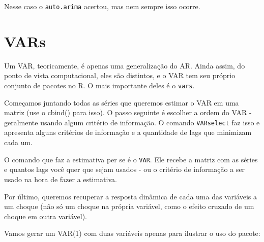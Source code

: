 \documentclass[
]{book}
\begin{document}
Nesse caso o \texttt{auto.arima} acertou, mas nem sempre isso ocorre.

\hypertarget{vars}{%
\section{VARs}\label{vars}}

Um VAR, teoricamente, é apenas uma generalização do AR. Ainda assim, do ponto de vista computacional, eles são distintos, e o VAR tem seu próprio conjunto de pacotes no R. O mais importante deles é o \texttt{vars}.

Começamos juntando todas as séries que queremos estimar o VAR em uma matriz (use o cbind() para isso). O passo seguinte é escolher a ordem do VAR - geralmente usando algum critério de informação. O comando \texttt{VARselect} faz isso e apresenta alguns critérios de informação e a quantidade de lags que minimizam cada um.

O comando que faz a estimativa per se é o \texttt{VAR}. Ele recebe a matriz com as séries e quantos lags você quer que sejam usados - ou o critério de informação a ser usado na hora de fazer a estimativa.

Por último, queremos recuperar a resposta dinâmica de cada uma das variáveis a um choque (não só um choque na própria variável, como o efeito cruzado de um choque em outra variável).

Vamos gerar um VAR(1) com duas variáveis apenas para ilustrar o uso do pacote:
\end{document}
